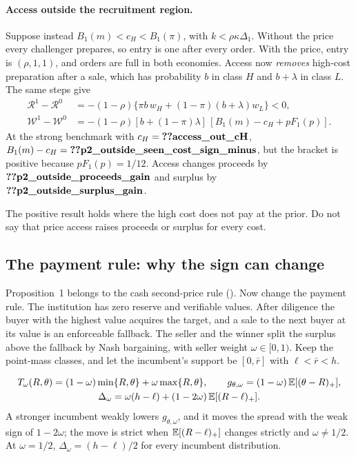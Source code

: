 \paragraph{Access outside the recruitment region.} Suppose instead \(B_1(m)<c_H<B_1(\pi)\), with
\(k<\rho\kappa\Delta_1\). Without the price every challenger prepares, so entry is one after every order. With the
price, entry is \((\rho,1,1)\), and orders are full in both economies. Access now \emph{removes} high-cost preparation
after a sale, which has probability \(b\) in class \(H\) and \(b+\lambda\) in class \(L\). The same steps give
\begin{align*}
\mathcal R^1-\mathcal R^0&=-(1-\rho)\{\pi b\,w_H+(1-\pi)(b+\lambda)w_L\}<0,\\
\mathcal W^1-\mathcal W^0&=-(1-\rho)[b+(1-\pi)\lambda]\,[B_1(m)-c_H+pF_1(p)].
\end{align*}
At the strong benchmark with \(c_H=\reg{access_out_cH}\), \(B_1(m)-c_H=\reg{p2_outside_seen_cost_sign_minus}\), but the
bracket is positive because \(pF_1(p)=1/12\). Access changes proceeds by \(\reg{p2_outside_proceeds_gain}\) and surplus
by \(\reg{p2_outside_surplus_gain}\).

\begin{caution}
The positive result holds where the high cost does not pay at the prior. Do not say that price access raises
proceeds or surplus for every cost.
\end{caution}

\subsection{The payment rule: why the sign can change}\label{sec:11_welfare-payment}

Proposition~1 belongs to the cash second-price rule (). Now change the payment rule. The
institution has zero reserve and verifiable values. After diligence the buyer with the highest value acquires the
target, and a sale to the next buyer at its value is an enforceable fallback. The seller and the winner split the
surplus above the fallback by Nash bargaining, with seller weight \(\omega\in[0,1)\). Keep the point-mass classes, and
let the incumbent's support be \([0,\bar r]\) with \(\ell<\bar r<h\).

\begin{resultbox}
\begin{gather*}
T_\omega(R,\theta)=(1-\omega)\min\{R,\theta\}+\omega\max\{R,\theta\},\qquad
g_{\theta,\omega}=(1-\omega)\,\mathbb{E}[(\theta-R)_+],\\
\Delta_\omega=\omega(h-\ell)+(1-2\omega)\,\mathbb{E}[(R-\ell)_+].
\end{gather*}
A stronger incumbent weakly lowers \(g_{\theta,\omega}\), and it moves the spread with the weak sign of \(1-2\omega\);
the move is strict when \(\mathbb{E}[(R-\ell)_+]\) changes strictly and \(\omega\ne1/2\). At \(\omega=1/2\),
\(\Delta_\omega=(h-\ell)/2\) for every incumbent distribution.
\end{resultbox}

